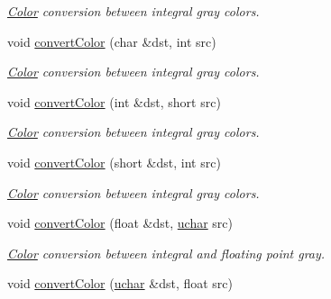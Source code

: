 \begin{DoxyCompactItemize}
\begin{DoxyCompactList}\small\item\em \hyperlink{class_d_o_1_1_color}{Color} conversion between integral gray colors. \end{DoxyCompactList}\item 
\hypertarget{group___color_conversion_gaed95c34a03689a19d0fb4b3402a4f663}{void \hyperlink{group___color_conversion_gaed95c34a03689a19d0fb4b3402a4f663}{convert\-Color} (char \&dst, int src)}\label{group___color_conversion_gaed95c34a03689a19d0fb4b3402a4f663}

\begin{DoxyCompactList}\small\item\em \hyperlink{class_d_o_1_1_color}{Color} conversion between integral gray colors. \end{DoxyCompactList}\item 
\hypertarget{group___color_conversion_ga74c347b60b2f8f89d49e8edf95bc256c}{void \hyperlink{group___color_conversion_ga74c347b60b2f8f89d49e8edf95bc256c}{convert\-Color} (int \&dst, short src)}\label{group___color_conversion_ga74c347b60b2f8f89d49e8edf95bc256c}

\begin{DoxyCompactList}\small\item\em \hyperlink{class_d_o_1_1_color}{Color} conversion between integral gray colors. \end{DoxyCompactList}\item 
\hypertarget{group___color_conversion_ga2886b206c1b6cdaeb4ca77afef11c49f}{void \hyperlink{group___color_conversion_ga2886b206c1b6cdaeb4ca77afef11c49f}{convert\-Color} (short \&dst, int src)}\label{group___color_conversion_ga2886b206c1b6cdaeb4ca77afef11c49f}

\begin{DoxyCompactList}\small\item\em \hyperlink{class_d_o_1_1_color}{Color} conversion between integral gray colors. \end{DoxyCompactList}\item 
\hypertarget{group___color_conversion_gacdd167431700fa7e3262bd0cd0505512}{void \hyperlink{group___color_conversion_gacdd167431700fa7e3262bd0cd0505512}{convert\-Color} (float \&dst, \hyperlink{group___eigen_typedefs_ga65f85814a8290f9797005d3b28e7e5fc}{uchar} src)}\label{group___color_conversion_gacdd167431700fa7e3262bd0cd0505512}

\begin{DoxyCompactList}\small\item\em \hyperlink{class_d_o_1_1_color}{Color} conversion between integral and floating point gray. \end{DoxyCompactList}\item 
\hypertarget{group___color_conversion_ga4c458acc6b6b19eff6e85750fc53379e}{void \hyperlink{group___color_conversion_ga4c458acc6b6b19eff6e85750fc53379e}{convert\-Color} (\hyperlink{group___eigen_typedefs_ga65f85814a8290f9797005d3b28e7e5fc}{uchar} \&dst, float src)}\label{group___color_conversion_ga4c458acc6b6b19eff6e85750fc53379e}


\end{DoxyCompactItemize}

